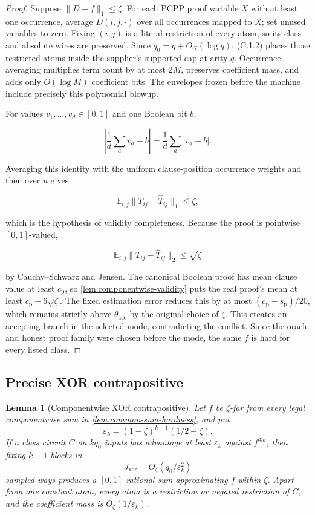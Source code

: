 \documentclass[11pt,letterpaper]{article}
\newcommand{\cref}[1]{\ref{#1}}
\newtheorem{lemma}[theorem]{Lemma}
\theoremstyle{definition}
\theoremstyle{remark}
\begin{document}
\begin{proof} Suppose \(\lVert D-f\rVert_1\le\zeta\). For each PCPP
proof variable \(X\) with at least one occurrence, average
\(D(i,j,\cdot)\) over all occurrences mapped to \(X\); set unused
variables to zero. Fixing \((i,j)\) is a literal restriction of every
atom, so its class and absolute wires are preserved. Since
\(q_0=q+O_G(\log q)\), (C.1.2) places those restricted atoms inside the
supplier's supported cap at arity \(q\). Occurrence
averaging multiplies term count by at most \(2M\), preserves coefficient
mass, and adds only \(O(\log M)\) coefficient bits. The envelopes frozen
before the machine include precisely this polynomial blowup.

For values \(v_1,\ldots,v_d\in[0,1]\) and one Boolean bit \(b\),

\[
\left|
\frac1d\sum_av_a-b
\right|
{}={}
\frac1d\sum_a|v_a-b|.
\]

Averaging this identity with the uniform clause-position occurrence
weights and then over \(u\) gives

\[
\mathbb E_{i,j}
\lVert T_{ij}-\widehat T_{ij}\rVert_1
\le
\zeta,
\]

which is the hypothesis of validity completeness. Because the proof is
pointwise \([0,1]\)-valued,

\[
\mathbb E_{i,j}
\lVert T_{ij}-\widehat T_{ij}\rVert_2
\le
\sqrt{\zeta}
\]

by Cauchy--Schwarz and Jensen. The canonical Boolean proof has mean
clause value at least \(c_{\mathrm p}\), so \cref{lem:componentwise-validity} puts the real
proof's mean at least \(c_{\mathrm p}-6\sqrt\zeta\). The
fixed estimation error reduces this by at most
\((c_{\mathrm p}-s_{\mathrm p})/20\), which remains strictly above
\(\theta_{\mathrm{acc}}\) by the original choice of \(\zeta\). This
creates an accepting branch in the selected mode, contradicting the
conflict. Since the oracle and honest proof family were chosen before
the mode, the same \(f\) is hard for every listed class. \end{proof}

\subsection{Precise XOR
contrapositive}\label{c11-precise-xor-contrapositive}

\begin{lemma}[Componentwise XOR contrapositive]
\label{lem:xor-contrapositive}
Let \(f\) be
\(\zeta\)-far from every legal componentwise sum in \cref{lem:common-sum-hardness}, and
put \[
\varepsilon_k
{}={}
(1-\zeta)^{k-1}(1/2-\zeta).
\] If a class circuit \(C\) on \(kq_0\) inputs has advantage at least
\(\varepsilon_k\) against \(f^{\oplus k}\), then fixing \(k-1\) blocks
in \[
J_{\mathrm{xor}}
{}={}
O_\zeta(q_0/\varepsilon_k^2)
\] sampled ways produces a \([0,1]\) rational sum approximating \(f\)
within \(\zeta\). Apart from one constant atom, every atom is a
restriction or negated restriction of \(C\), and the coefficient mass is
\(O_\zeta(1/\varepsilon_k)\).
\end{lemma}
\end{document}
